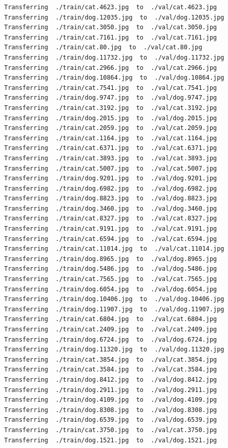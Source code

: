 \documentclass[]{book}
\theoremstyle{definition}
\theoremstyle{definition}
\theoremstyle{definition}
\theoremstyle{remark}
\begin{document}
\begin{verbatim}
Transferring  ./train/cat.4623.jpg  to  ./val/cat.4623.jpg
Transferring  ./train/dog.12035.jpg  to  ./val/dog.12035.jpg
Transferring  ./train/cat.3050.jpg  to  ./val/cat.3050.jpg
Transferring  ./train/cat.7161.jpg  to  ./val/cat.7161.jpg
Transferring  ./train/cat.80.jpg  to  ./val/cat.80.jpg
Transferring  ./train/dog.11732.jpg  to  ./val/dog.11732.jpg
Transferring  ./train/cat.2966.jpg  to  ./val/cat.2966.jpg
Transferring  ./train/dog.10864.jpg  to  ./val/dog.10864.jpg
Transferring  ./train/cat.7541.jpg  to  ./val/cat.7541.jpg
Transferring  ./train/dog.9747.jpg  to  ./val/dog.9747.jpg
Transferring  ./train/cat.3192.jpg  to  ./val/cat.3192.jpg
Transferring  ./train/dog.2015.jpg  to  ./val/dog.2015.jpg
Transferring  ./train/cat.2059.jpg  to  ./val/cat.2059.jpg
Transferring  ./train/cat.1164.jpg  to  ./val/cat.1164.jpg
Transferring  ./train/cat.6371.jpg  to  ./val/cat.6371.jpg
Transferring  ./train/cat.3893.jpg  to  ./val/cat.3893.jpg
Transferring  ./train/cat.5007.jpg  to  ./val/cat.5007.jpg
Transferring  ./train/dog.9201.jpg  to  ./val/dog.9201.jpg
Transferring  ./train/dog.6982.jpg  to  ./val/dog.6982.jpg
Transferring  ./train/dog.8823.jpg  to  ./val/dog.8823.jpg
Transferring  ./train/dog.3460.jpg  to  ./val/dog.3460.jpg
Transferring  ./train/cat.8327.jpg  to  ./val/cat.8327.jpg
Transferring  ./train/cat.9191.jpg  to  ./val/cat.9191.jpg
Transferring  ./train/cat.6594.jpg  to  ./val/cat.6594.jpg
Transferring  ./train/cat.11014.jpg  to  ./val/cat.11014.jpg
Transferring  ./train/dog.8965.jpg  to  ./val/dog.8965.jpg
Transferring  ./train/dog.5486.jpg  to  ./val/dog.5486.jpg
Transferring  ./train/cat.7565.jpg  to  ./val/cat.7565.jpg
Transferring  ./train/dog.6054.jpg  to  ./val/dog.6054.jpg
Transferring  ./train/dog.10406.jpg  to  ./val/dog.10406.jpg
Transferring  ./train/dog.11907.jpg  to  ./val/dog.11907.jpg
Transferring  ./train/cat.6804.jpg  to  ./val/cat.6804.jpg
Transferring  ./train/cat.2409.jpg  to  ./val/cat.2409.jpg
Transferring  ./train/dog.6724.jpg  to  ./val/dog.6724.jpg
Transferring  ./train/dog.11320.jpg  to  ./val/dog.11320.jpg
Transferring  ./train/cat.3854.jpg  to  ./val/cat.3854.jpg
Transferring  ./train/cat.3584.jpg  to  ./val/cat.3584.jpg
Transferring  ./train/dog.8412.jpg  to  ./val/dog.8412.jpg
Transferring  ./train/dog.2911.jpg  to  ./val/dog.2911.jpg
Transferring  ./train/dog.4109.jpg  to  ./val/dog.4109.jpg
Transferring  ./train/dog.8308.jpg  to  ./val/dog.8308.jpg
Transferring  ./train/dog.6539.jpg  to  ./val/dog.6539.jpg
Transferring  ./train/cat.3750.jpg  to  ./val/cat.3750.jpg
Transferring  ./train/dog.1521.jpg  to  ./val/dog.1521.jpg

\end{verbatim}
\end{document}
